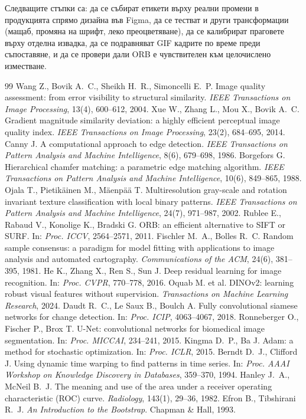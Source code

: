 \documentclass[a4paper,12pt]{article}
\begin{document}
Следващите стъпки са: да се събират етикети върху реални промени в продукцията спрямо дизайна във Figma, да се тестват и други трансформации (мащаб, промяна на шрифт, леко преоцветяване), да се калибрират праговете върху отделна извадка, да се подравняват GIF кадрите по време преди съпоставяне, и да се провери дали ORB е чувствителен към целочислено изместване.

\begin{thebibliography}{99}
 Wang Z., Bovik A.~C., Sheikh H.~R., Simoncelli E.~P. Image quality assessment: from error visibility to structural similarity. \emph{IEEE Transactions on Image Processing}, 13(4), 600--612, 2004.
 Xue W., Zhang L., Mou X., Bovik A.~C. Gradient magnitude similarity deviation: a highly efficient perceptual image quality index. \emph{IEEE Transactions on Image Processing}, 23(2), 684--695, 2014.
 Canny J. A computational approach to edge detection. \emph{IEEE Transactions on Pattern Analysis and Machine Intelligence}, 8(6), 679--698, 1986.
 Borgefors G. Hierarchical chamfer matching: a parametric edge matching algorithm. \emph{IEEE Transactions on Pattern Analysis and Machine Intelligence}, 10(6), 849--865, 1988.
 Ojala T., Pietikäinen M., Mäenpää T. Multiresolution gray-scale and rotation invariant texture classification with local binary patterns. \emph{IEEE Transactions on Pattern Analysis and Machine Intelligence}, 24(7), 971--987, 2002.
 Rublee E., Rabaud V., Konolige K., Bradski G. ORB: an efficient alternative to SIFT or SURF. In: \emph{Proc. ICCV}, 2564--2571, 2011.
 Fischler M.~A., Bolles R.~C. Random sample consensus: a paradigm for model fitting with applications to image analysis and automated cartography. \emph{Communications of the ACM}, 24(6), 381--395, 1981.
 He K., Zhang X., Ren S., Sun J. Deep residual learning for image recognition. In: \emph{Proc. CVPR}, 770--778, 2016.
 Oquab M. et al. DINOv2: learning robust visual features without supervision. \emph{Transactions on Machine Learning Research}, 2024.
 Daudt R.~C., Le Saux B., Boulch A. Fully convolutional siamese networks for change detection. In: \emph{Proc. ICIP}, 4063--4067, 2018.
 Ronneberger O., Fischer P., Brox T. U-Net: convolutional networks for biomedical image segmentation. In: \emph{Proc. MICCAI}, 234--241, 2015.
 Kingma D.~P., Ba J. Adam: a method for stochastic optimization. In: \emph{Proc. ICLR}, 2015.
 Berndt D.~J., Clifford J. Using dynamic time warping to find patterns in time series. In: \emph{Proc. AAAI Workshop on Knowledge Discovery in Databases}, 359--370, 1994.
 Hanley J.~A., McNeil B.~J. The meaning and use of the area under a receiver operating characteristic (ROC) curve. \emph{Radiology}, 143(1), 29--36, 1982.
 Efron B., Tibshirani R.~J. \emph{An Introduction to the Bootstrap}. Chapman \& Hall, 1993.
\end{thebibliography}
\end{document}
